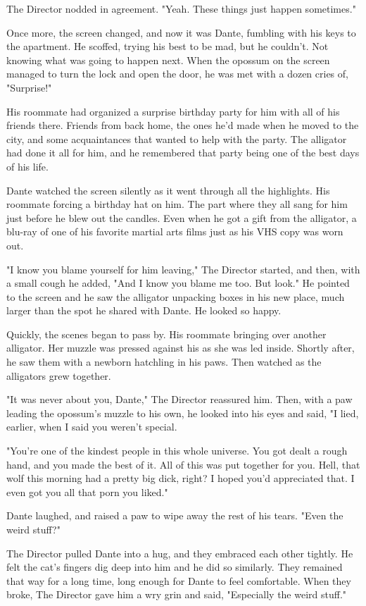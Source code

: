 The Director nodded in agreement. "Yeah. These things just happen sometimes."

Once more, the screen changed, and now it was Dante, fumbling with his keys to the apartment. He scoffed, trying his best to be mad, but he couldn't. Not knowing what was going to happen next. When the opossum on the screen managed to turn the lock and open the door, he was met with a dozen cries of, "Surprise!"

His roommate had organized a surprise birthday party for him with all of his friends there. Friends from back home, the ones he'd made when he moved to the city, and some acquaintances that wanted to help with the party. The alligator had done it all for him, and he remembered that party being one of the best days of his life.

Dante watched the screen silently as it went through all the highlights. His roommate forcing a birthday hat on him. The part where they all sang for him just before he blew out the candles. Even when he got a gift from the alligator, a blu-ray of one of his favorite martial arts films just as his VHS copy was worn out.

"I know you blame yourself for him leaving," The Director started, and then, with a small cough he added, "And I know you blame me too. But look." He pointed to the screen and he saw the alligator unpacking boxes in his new place, much larger than the spot he shared with Dante. He looked so happy.

Quickly, the scenes began to pass by. His roommate bringing over another alligator. Her muzzle was pressed against his as she was led inside. Shortly after, he saw them with a newborn hatchling in his paws. Then watched as the alligators grew together.

"It was never about you, Dante," The Director reassured him. Then, with a paw leading the opossum's muzzle to his own, he looked into his eyes and said, "I lied, earlier, when I said you weren't special.

"You're one of the kindest people in this whole universe. You got dealt a rough hand, and you made the best of it. All of this was put together for you. Hell, that wolf this morning had a pretty big dick, right? I hoped you'd appreciated that. I even got you all that porn you liked."

Dante laughed, and raised a paw to wipe away the rest of his tears. "Even the weird stuff?"

The Director pulled Dante into a hug, and they embraced each other tightly. He felt the cat's fingers dig deep into him and he did so similarly. They remained that way for a long time, long enough for Dante to feel comfortable. When they broke, The Director gave him a wry grin and said, "Especially the weird stuff."

